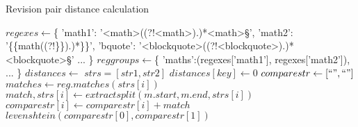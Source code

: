 \begin{algorithm}
  \caption{Revision pair distance calculation}\label{dist-calc}
  \begin{algorithmic}
    \State $regexes \gets $\{
    \Statex  'math1': '<math>((?!<\/math>).)*<\/math>\S',
    \Statex  'math2': '\{\{math((?!\}\}).)*\}\}',
    \Statex 'bquote': '<blockquote>((?!<\/blockquote>).)*<\/blockquote>\S'
    \Statex  ...
    \Statex\}
    \State $reggroups \gets $\{
    \Statex  'maths':(regexes['math1'], regexes['math2']),
    \Statex  ...
    \Statex \}
    \State $distances \gets {}$
    \State $strs = [str1, str2]$
    \State $distances[key] \gets 0$
    \State $comparestr \gets [``", ``"]$
    \State $matches \gets reg.matches(strs[i])$
    \State $match, strs[i] \gets extractsplit(m.start, m.end, strs[i])$
    \State $comparestr[i] \gets comparestr[i] + match$
    \EndFor
    \EndFor
    \State $levenshtein(comparestr[0], comparestr[1])$
    \EndIf
    \EndFor
    \EndFunction
  \end{algorithmic}
\end{algorithm}
